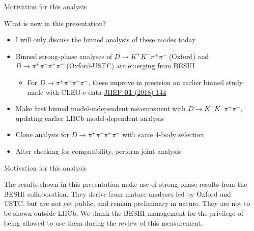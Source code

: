 \documentclass[xcolor={dvipsnames}]{beamer}
\begin{document}
\begin{frame}{Motivation for this analysis}
  \begin{center}
    {\Large What is new in this presentation?}
  \end{center}
  \begin{itemize}
    \setlength\itemsep{1.0em}
    \item{I will only discuss the binned analysis of these modes today}
    \item{Binned strong-phase analyses of $D\to K^+K^-\pi^+\pi^-$ (Oxford) and $D\to\pi^+\pi^-\pi^+\pi^-$ (Oxford-USTC) are emerging from BESIII}
    \begin{itemize}
      \item{For $D\to\pi^+\pi^-\pi^+\pi^-$, these improve in precision on earlier binned study made with CLEO-c data \href{https://link.springer.com/article/10.1007/JHEP01(2018)144}{JHEP \textbf{01} (2018) 144}}
    \end{itemize}
    \item{Make first binned model-independent measurement with $D\to K^+K^-\pi^+\pi^-$, updating earlier LHCb model-dependent analysis}
    \item{Clone analysis for $D\to\pi^+\pi^-\pi^+\pi^-$ with same 4-body selection}
    \item{After checking for compatibility, perform joint analysis}
  \end{itemize}
\end{frame}

\begin{frame}{Motivation for this analysis}
  \begin{center}
    {\color{blue}The results shown in this presentation make use of strong-phase results from the BESIII collaboration. They derive from mature analyses led by Oxford and USTC, but are not yet public, and remain preliminary in nature. They are not to be shown outside LHCb. We thank the BESIII management for the privilege of being allowed to use them during the review of this measurement.}
  \end{center}
\end{frame}
\end{document}
